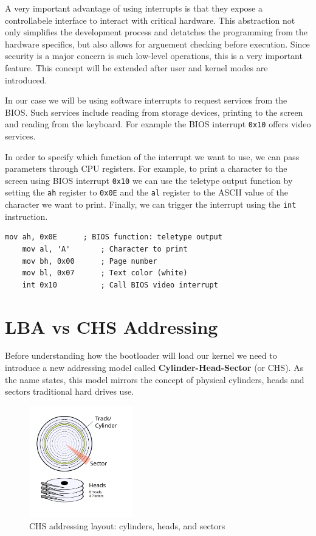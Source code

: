 A very important advantage of using interrupts is that they expose a controllabele interface to interact with critical
hardware. This abstraction not only simplifies the development process and detatches the programming from the hardware
specifics, but also allows for arguement checking before execution. Since security is a major concern is such low-level
operations, this is a very important feature. This concept will be extended after user and kernel modes are introduced.

In our case we will be using software interrupts to request services from the BIOS. Such services include reading from
storage devices, printing to the screen and reading from the keyboard. For example the BIOS interrupt \texttt{0x10}
offers video services.

In order to specify which function of the interrupt we want to use, we can pass parameters through CPU registers.
For example, to print a character to the screen using BIOS interrupt \texttt{0x10} we can use the teletype output function
by setting the \texttt{ah} register to \texttt{0x0E} and the \texttt{al} register to the ASCII value of the character we want
to print. Finally, we can trigger the interrupt using the \texttt{int} instruction.

\begin{lstlisting}[caption={Simple BIOS interrupt call in assembly}]
    mov ah, 0x0E      ; BIOS function: teletype output
    mov al, 'A'       ; Character to print
    mov bh, 0x00      ; Page number
    mov bl, 0x07      ; Text color (white)
    int 0x10          ; Call BIOS video interrupt
\end{lstlisting}


\section{LBA vs CHS Addressing}

Before understanding how the bootloader will load our kernel we need to introduce a new addressing
model called \textbf{Cylinder-Head-Sector} (or CHS). As the name states, this model mirrors the concept of physical 
cylinders, heads and sectors traditional hard drives use. 

\begin{figure}[H]
    \centering
    \includegraphics[width=0.4\textwidth]{images/chs_diagram.png}
    \caption{CHS addressing layout: cylinders, heads, and sectors}
    \label{fig:chs}
\end{figure}

